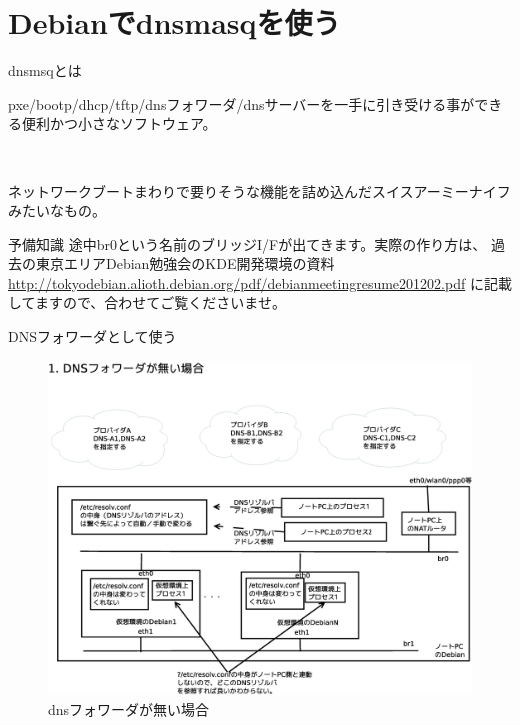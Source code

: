 \section{Debianでdnsmasqを使う}

\begin{frame}{dnsmsqとは}

 pxe/bootp/dhcp/tftp/dnsフォワーダ/dnsサーバーを一手に引き受ける事ができる便利かつ小さなソフトウェア。

　\begin{center}
\Large ネットワークブートまわりで要りそうな機能を詰め込んだスイスアーミーナイフみたいなもの。
  \end{center}

\end{frame}

\begin{frame}{予備知識}
 途中br0という名前のブリッジI/Fが出てきます。実際の作り方は、
 過去の東京エリアDebian勉強会のKDE開発環境の資料
\url{http://tokyodebian.alioth.debian.org/pdf/debianmeetingresume201202.pdf}
に記載してますので、合わせてご覧くださいませ。
\end{frame}

\begin{frame}{DNSフォワーダとして使う}
\begin{figure}[H]
\begin{center}
 \includegraphics[width=0.7\hsize]{image201402/vm-dns-env.eps}
 \caption{dnsフォワーダが無い場合}\label{fig:vm-env1}
\end{center}
\end{figure}
\end{frame}

